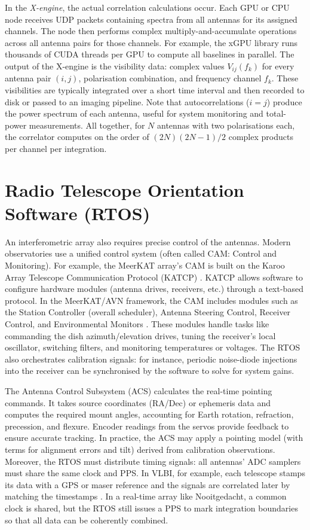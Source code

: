     In the \emph{X-engine}, the actual correlation calculations occur. Each GPU or CPU node receives UDP packets containing spectra from all antennas for its assigned channels. The node then performs complex multiply-and-accumulate operations across all antenna pairs for those channels. For example, the xGPU library runs thousands of CUDA threads per GPU to compute all baselines in parallel. The output of the X-engine is the visibility data: complex values $V_{ij}(f_k)$ for every antenna pair $(i,j)$, polarisation combination, and frequency channel $f_k$. These visibilities are typically integrated over a short time interval and then recorded to disk or passed to an imaging pipeline. Note that autocorrelations ($i=j$) produce the power spectrum of each antenna, useful for system monitoring and total-power measurements. All together, for $N$ antennas with two polarisations each, the correlator computes on the order of $(2N)(2N-1)/2$ complex products per channel per integration.
    
    \section{Radio Telescope Orientation Software (RTOS)}
    An interferometric array also requires precise control of the antennas. Modern observatories use a unified control system (often called CAM: Control and Monitoring). For example, the MeerKAT array’s CAM is built on the Karoo Array Telescope Communication Protocol (KATCP) \cite{Schwartz2023}. KATCP allows software to configure hardware modules (antenna drives, receivers, etc.) through a text-based protocol. In the MeerKAT/AVN framework, the CAM includes modules such as the Station Controller (overall scheduler), Antenna Steering Control, Receiver Control, and Environmental Monitors \cite{Schwartz2023}. These modules handle tasks like commanding the dish azimuth/elevation drives, tuning the receiver’s local oscillator, switching filters, and monitoring temperatures or voltages. The RTOS also orchestrates calibration signals: for instance, periodic noise-diode injections into the receiver can be synchronised by the software to solve for system gains. 
    
    The Antenna Control Subsystem (ACS) calculates the real-time pointing commands. It takes source coordinates (RA/Dec) or ephemeris data and computes the required mount angles, accounting for Earth rotation, refraction, precession, and flexure. Encoder readings from the servos provide feedback to ensure accurate tracking. In practice, the ACS may apply a pointing model (with terms for alignment errors and tilt) derived from calibration observations. Moreover, the RTOS must distribute timing signals: all antennas’ ADC samplers must share the same clock and PPS. In VLBI, for example, each telescope stamps its data with a GPS or maser reference and the signals are correlated later by matching the timestamps \cite{Schwartz2023}. In a real-time array like Nooitgedacht, a common clock is shared, but the RTOS still issues a PPS to mark integration boundaries so that all data can be coherently combined.
    
